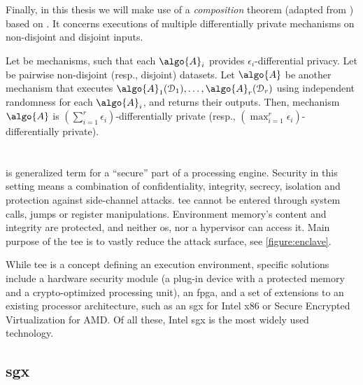 				Finally, in this thesis we will make use of a \emph{composition} theorem (adapted from \cite{privacy-integrated-queries}) based on \cite{differential-privacy-original,our-data-ourselves}. %
				It concerns executions of multiple differentially private mechanisms on non-disjoint and disjoint inputs.

				\begin{theorem}\label{theorem:composition}
					Let  be mechanisms, such that each $\algo{A}_i$ provides $\epsilon_i$-differential privacy.
					Let  be pairwise non-disjoint (resp., disjoint) datasets.
					Let $\algo{A}$ be another mechanism that executes $\algo{A}_1(\database_1), \ldots, \algo{A}_r(\database_r)$ using independent randomness for each $\algo{A}_i$, and returns their outputs.
					Then, mechanism $\algo{A}$ is $\left( \sum_{i=1}^r \epsilon_i \right)$-differentially private (resp., $\left( \max_{i=1}^r \epsilon_i \right)$-differentially private).
				\end{theorem}

	\section{\texorpdfstring{}{Trusted Execution Environments}}

		 is generalized term for a ``secure'' part of a processing engine.
		Security in this setting means a combination of confidentiality, integrity, secrecy, isolation and protection against side-channel attacks.
		\acrshort{tee} cannot be entered through system calls, jumps or register manipulations.
		Environment memory's content and integrity are protected, and neither \acrshort{os}, nor a hypervisor can access it.
		Main purpose of the \acrshort{tee} is to vastly reduce the attack surface, see \cref{figure:enclave}.

		

		While \acrshort{tee} is a concept defining an execution environment, specific solutions include a hardware security module (a plug-in device with a protected memory and a crypto-optimized processing unit), an \acrshort{fpga}, and a set of extensions to an existing processor architecture, such as an \acrshort{sgx} for Intel x86 or Secure Encrypted Virtualization \cite{amd-memory-encryption} for AMD\@.
		Of all these, Intel \acrshort{sgx} is the most widely used technology.

		\subsection{\texorpdfstring{\acrlong{sgx}}{Software Guard Extensions}}

